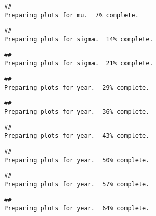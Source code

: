 \documentclass[
]{article}
\newenvironment{Shaded}{\begin{snugshade}}{\end{snugshade}}
\newcommand{\FunctionTok}[1]{\textcolor[rgb]{0.13,0.29,0.53}{\textbf{#1}}}
\newcommand{\NormalTok}[1]{#1}
\newcommand{\SpecialCharTok}[1]{\textcolor[rgb]{0.81,0.36,0.00}{\textbf{#1}}}
\begin{document}
\begin{Shaded}
\end{Shaded}

\begin{verbatim}
##                                                                                 Preparing plots for mu.  7% complete.
\end{verbatim}

\begin{verbatim}
##                                                                                 Preparing plots for sigma.  14% complete.
\end{verbatim}

\begin{verbatim}
##                                                                                 Preparing plots for sigma.  21% complete.
\end{verbatim}

\begin{verbatim}
##                                                                                 Preparing plots for year.  29% complete.
\end{verbatim}

\begin{verbatim}
##                                                                                 Preparing plots for year.  36% complete.
\end{verbatim}

\begin{verbatim}
##                                                                                 Preparing plots for year.  43% complete.
\end{verbatim}

\begin{verbatim}
##                                                                                 Preparing plots for year.  50% complete.
\end{verbatim}

\begin{verbatim}
##                                                                                 Preparing plots for year.  57% complete.
\end{verbatim}

\begin{verbatim}
##                                                                                 Preparing plots for year.  64% complete.
\end{verbatim}
\end{document}
